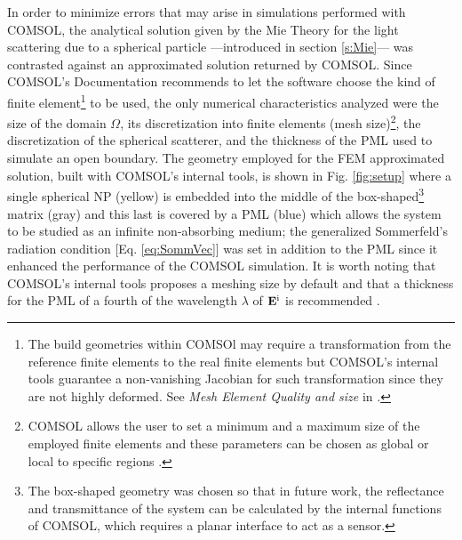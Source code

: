 In order to minimize errors that may arise in simulations performed with COMSOL, the analytical solution given by the Mie Theory for the light scattering due to a spherical particle ---introduced in section \ref{s:Mie}--- was contrasted against an approximated solution returned by COMSOL. Since COMSOL's Documentation \cite{comsol_doc} recommends to let the software choose the kind of finite element\footnote{The build geometries within COMSOl may require a transformation from the reference finite elements to the real finite elements but COMSOL's internal tools guarantee a non-vanishing Jacobian for such transformation since they are not highly deformed. See \textit{Mesh Element Quality and size} in \cite{comsol_doc}.} to be used, the only numerical characteristics analyzed were the size of the domain $\Omega$, its discretization into finite elements (mesh size)\footnote{COMSOL allows the user to set a minimum and a maximum size of the employed finite elements and these parameters can be chosen as global or local to specific regions \cite{comsol_doc}.}, the discretization of the spherical scatterer, and the thickness of the PML used to simulate an open boundary. The geometry employed for the FEM approximated solution, built with COMSOL's internal tools, is shown in Fig. \ref{fig:setup} where a single spherical NP (yellow) is embedded into  the middle of the box-shaped\footnote{The box-shaped geometry was chosen so that in future work, the reflectance and transmittance of the system can be calculated by the internal functions of COMSOL, which requires a planar interface to act as a sensor.} matrix (gray) and this last is covered by a PML (blue) which allows the system to be studied as an infinite non-absorbing medium; the generalized Sommerfeld's radiation condition [Eq. \eqref{eq:SommVec}] was set in addition to the PML since it enhanced the performance of the COMSOL simulation. It is worth noting that COMSOL's internal tools proposes a meshing size by default \cite{comsol_doc} and that a thickness for the PML of a fourth of the wavelength $\lambda$ of $\vb{E}^\text{i}$ is recommended \cite{comsol_wave}.


